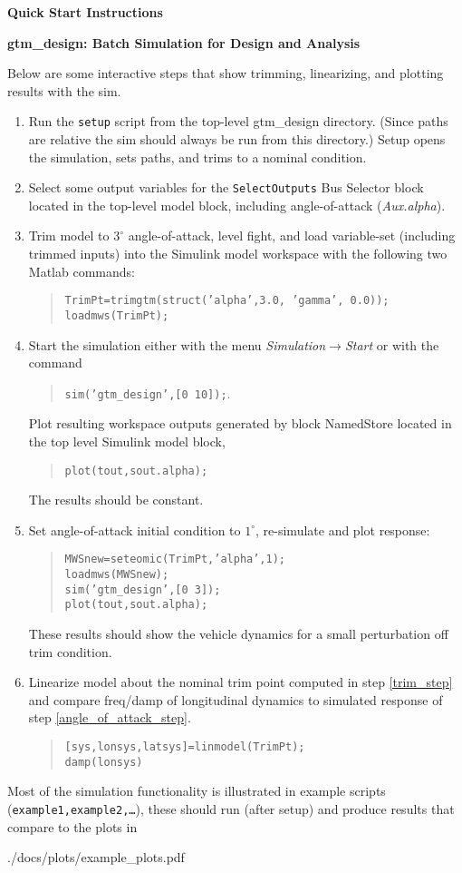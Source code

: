 \documentclass[12pt]{article}
\begin{document}
\centerline{\bf \Large Quick Start Instructions}
\centerline{\bf gtm\_design: Batch Simulation for Design and Analysis}

\vspace{.5in}
Below are some interactive steps that show trimming, linearizing, and
plotting results with the sim.

\begin{enumerate}
\item Run the {\tt setup} script from the top-level gtm\_design
  directory.  (Since paths are relative the sim should always be run
  from this directory.) Setup opens the simulation, sets paths, and
  trims to a nominal condition.
\item Select some output variables for the {\tt SelectOutputs} Bus Selector block located in
the top-level model block, including angle-of-attack ({\em Aux.alpha}).

\item \label{trim_step} Trim model to $3^\circ$ angle-of-attack, level
fight, and load variable-set (including trimmed inputs) into the
Simulink model workspace with the following two Matlab commands:
\begin{quote}
{\tt TrimPt=trimgtm(struct('alpha',3.0,  'gamma', 0.0));}\\
{\tt loadmws(TrimPt);}
\end{quote}
\item Start the simulation either with the menu {\em
Simulation$\rightarrow$Start} or with the command 
\begin{quote}{\tt sim('gtm\_design',[0 10]);}.\end{quote}
Plot resulting workspace outputs generated by block
NamedStore located in the top level Simulink model block, 
\begin{quote} {\tt plot(tout,sout.alpha);} \end{quote}
The results should be constant.

\item \label{angle_of_attack_step} Set angle-of-attack initial
condition to $1^\circ$, re-simulate and plot response:
\begin{quote}
{\tt MWSnew=seteomic(TrimPt,'alpha',1);}\\
{\tt loadmws(MWSnew);}\\
{\tt sim('gtm\_design',[0 3]);}\\
{\tt plot(tout,sout.alpha);}
\end{quote}
These results should show the vehicle dynamics for a small
perturbation off trim condition.


\item Linearize model about the nominal trim point computed in
step \ref{trim_step} and compare freq/damp of longitudinal dynamics to simulated response
of step \ref{angle_of_attack_step}.

\begin{quote}
{\tt [sys,lonsys,latsys]=linmodel(TrimPt);}\\
{\tt damp(lonsys)}
\end{quote}
\end{enumerate}

Most of the simulation functionality is illustrated in example scripts
({\tt example1,example2,\ldots}), these should run (after setup) and
produce results that compare to the plots in

./docs/plots/example\_plots.pdf
\end{document}

